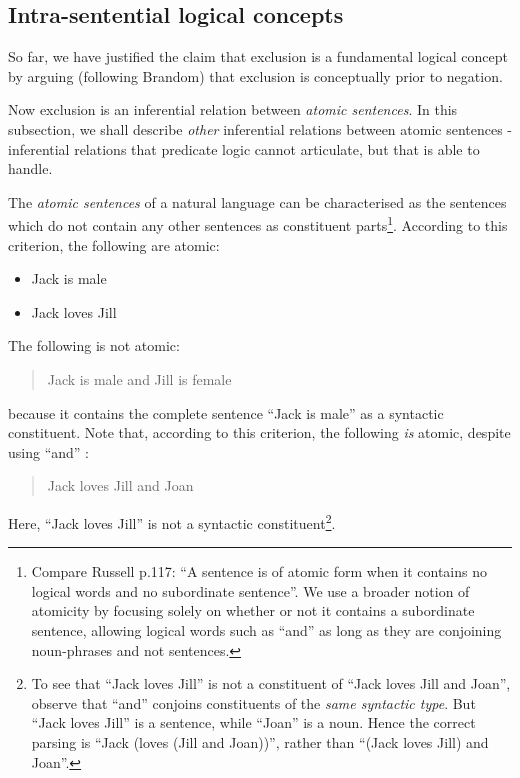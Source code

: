\subsection{Intra-sentential logical concepts}
\label{intrasentential}
So far, we have justified the claim that exclusion is a fundamental logical concept by arguing (following Brandom) that exclusion is conceptually prior to negation. 

Now exclusion is an inferential relation between \emph{atomic sentences}. 
In this subsection, we shall describe \emph{other} inferential relations between atomic sentences - inferential relations that predicate logic cannot articulate, but that \ELFULL{} is able to handle.

The \emph{atomic sentences} of a natural language can be
characterised as the sentences which do not contain any other
sentences as constituent parts\footnote{Compare Russell \cite{russell}
  p.117: ``A sentence is of atomic form when it contains no logical
  words and no subordinate sentence''. We use a broader notion of
  atomicity by focusing solely on whether or not it contains a
  subordinate sentence, allowing logical words such as ``and'' as long
  as they are conjoining noun-phrases and not sentences.}.  According
to this criterion, the following are atomic:

\begin{itemize}

\item Jack is male
\item Jack loves Jill
\end{itemize}

\NI The following is not atomic:

\begin{quote}
  Jack is male and Jill is female
\end{quote}

\NI because it contains the complete sentence ``Jack is male'' as a
syntactic constituent.  Note that, according to this criterion, the
following \emph{is} atomic, despite using ``and'' :

\begin{quote}
  Jack loves Jill and Joan
\end{quote}

\NI Here, ``Jack loves Jill'' is not a syntactic constituent\footnote{To see that ``Jack loves Jill'' is not a constituent of ``Jack loves Jill and Joan'', observe that ``and'' conjoins constituents of the \emph{same syntactic type}. But ``Jack loves Jill'' is a sentence, while ``Joan'' is a noun. Hence the correct parsing is ``Jack (loves (Jill and Joan))'', rather than ``(Jack loves Jill) and Joan''.}.

